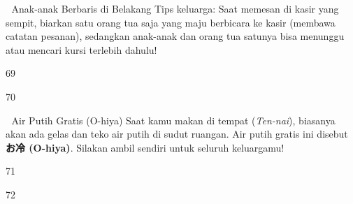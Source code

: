 \begin{lessonbox}{🎒 Anak-anak Berbaris di Belakang}
    Tips keluarga: Saat memesan di kasir yang sempit, biarkan satu orang tua saja yang maju berbicara ke kasir (membawa catatan pesanan), sedangkan anak-anak dan orang tua satunya bisa menunggu atau mencari kursi terlebih dahulu!
\end{lessonbox}

\begin{convobox}{69}
    \noindent
      

    \vspace{1.5em}
\end{convobox}

\begin{convobox}{70}
    \noindent

    \vspace{1.5em}
\end{convobox}

\begin{lessonbox}{🍵 Air Putih Gratis (O-hiya)}
    Saat kamu makan di tempat (\textit{Ten-nai}), biasanya akan ada gelas dan teko air putih di sudut ruangan. Air putih gratis ini disebut \textbf{お冷 (O-hiya)}. Silakan ambil sendiri untuk seluruh keluargamu!
\end{lessonbox}

\begin{convobox}{71}
    \noindent
       
       
      

    \vspace{1.5em}
\end{convobox}

\begin{convobox}{72}
    \noindent
      
     

    \vspace{1.5em}
\end{convobox}

